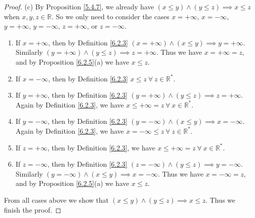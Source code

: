 \begin{proof}{(c)}
By Proposition \ref{5.4.7}, we already have \((x \leq y) \land (y \leq z) \implies x \leq z\) when \(x, y, z \in \mathds{R}\).
So we only need to consider the cases \(x = +\infty\), \(x = -\infty\), \(y = +\infty\), \(y = -\infty\), \(z = +\infty\), or \(z = -\infty\).
\begin{enumerate}[label=(\Roman*)]
    \item If \(x = +\infty\), then by Definition \ref{6.2.3} \((x = +\infty) \land (x \leq y) \implies y = +\infty\).
    Similarly \((y = +\infty) \land (y \leq z) \implies z = +\infty\).
    Thus we have \(x = +\infty = z\), and by Proposition \ref{6.2.5}(a) we have \(x \leq z\).
    \item If \(x = -\infty\), then by Definition \ref{6.2.3} \(x \leq z \ \forall\ z \in \mathds{R}^*\).
    \item If \(y = +\infty\), then by Definition \ref{6.2.3} \((y = +\infty) \land (y \leq z) \implies z = +\infty\).
    Again by Definition \ref{6.2.3}, we have \(x \leq +\infty = z \ \forall\ x \in \mathds{R}^*\).
    \item If \(y = -\infty\), then by Definition \ref{6.2.3} \((y = -\infty) \land (x \leq y) \implies x = -\infty\).
    Again by Definition \ref{6.2.3}, we have \(x = -\infty \leq z \ \forall\ z \in \mathds{R}^*\).
    \item If \(z = +\infty\), then by Definition \ref{6.2.3}, we have \(x \leq +\infty = z \ \forall\ x \in \mathds{R}^*\).
    \item If \(z = -\infty\), then by Definition \ref{6.2.3} \((z = -\infty) \land (y \leq z) \implies y = -\infty\).
    Similarly \((y = -\infty) \land (x \leq y) \implies x = -\infty\).
    Thus we have \(x = -\infty = z\), and by Proposition \ref{6.2.5}(a) we have \(x \leq z\).
\end{enumerate}
From all cases above we show that \((x \leq y) \land (y \leq z) \implies x \leq z\).
Thus we finish the proof.
\end{proof}

